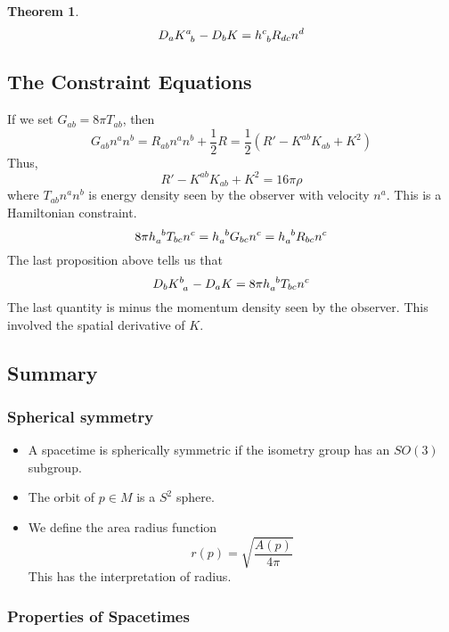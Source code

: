 \documentclass[11pt, oneside]{article}   	%
\theoremstyle{slanted}
\newtheorem*{thm}{Theorem}
\begin{document}
\begin{thm}
	\[
		D _ a K \indices{ ^ a _ b  }  - D _b K 
		 = h \indices{ ^ c _ b  } R _{ dc } n ^ d  
	\] 
\end{thm}

\subsection{The Constraint Equations}
If we set $ G _{ ab }  = 8 \pi T _{ab }$, 
then 
\[
 G _{ ab } n ^ a n ^ b  = R _{ ab } n ^ a n ^ b + \frac{1}{2 } R 
 = \frac{1}{2 } \left( R ' - K ^{ ab } K _{ ab } + K ^ 2  \right) 
\] Thus, 
\[
 R '  - K ^{ ab } K _{ ab }  +   K ^ 2  = 16 \pi \rho 
\] where $ T _{ ab } n ^ a n ^ b  $ is 
energy density seen by the observer with velocity $ n ^ a $. 
This is a Hamiltonian constraint. 
\[
 8 \pi h \indices{ _ a ^ b } T _{ b c } n ^ c  = 
 h \indices{ _ a ^ b } G _{ b c } n ^ c  = h \indices{ _ a ^ b  } R _{ b c } 
 n ^ c 
\] The last proposition above 
tells us that 
\[
 D _ b K \indices{ ^ b _ a  }  - D _ a K  = 8 \pi h \indices{ _ a 
 ^ b  } T _{ b c } n ^ c   
\] The last quantity is minus the momentum density seen by the observer. 
This involved the spatial derivative of $ K $. 
\subsection*{Summary}

\subsubsection*{Spherical symmetry}
\begin{itemize}
\item A spacetime is spherically symmetric if 
the isometry group has an $ SO ( 3 ) $ subgroup. 
\item The orbit of $ p \in M $ is a $  S ^ 2 $ sphere. 
\item We define the area radius function
\[
	r ( p )  = \sqrt{ \frac{ A( p ) }{ 4 \pi }} 
\] This has the interpretation of radius. 
\end{itemize}
\subsubsection*{Properties of Spacetimes}
\end{document}
